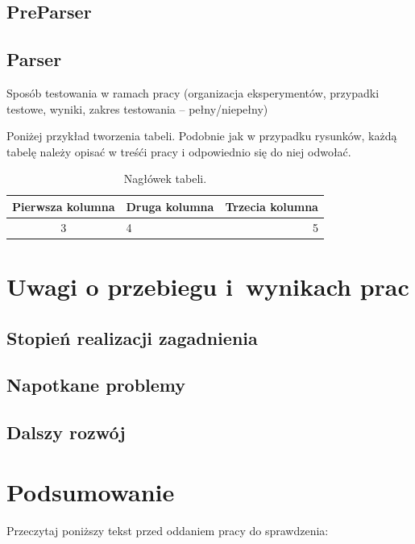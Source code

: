 \documentclass[a4paper]{book}
\begin{document}
\section {PreParser}
\section {Parser}
Sposób testowania w ramach pracy (organizacja eksperymentów, przypadki testowe, wyniki, zakres testowania -- pełny/niepełny)

Poniżej przykład tworzenia tabeli. Podobnie jak w przypadku rysunków, każdą tabelę należy opisać w treśći pracy i odpowiednio się do niej odwołać.

\begin{table}
	\centering
	\caption{Nagłówek tabeli.}
	\begin{tabular}{|c|l|r|}
		\hline
		Pierwsza kolumna & Druga kolumna & Trzecia kolumna \\
		\hline
		3 & 4 & 5 \\
		\hline 
	\end{tabular}
	\label{tab:przyklad_tabeli}
\end{table}

\chapter{Uwagi o przebiegu i~wynikach prac}
\section {Stopień realizacji zagadnienia}
\section{Napotkane problemy}
\section{Dalszy rozwój}

\chapter{Podsumowanie}


Przeczytaj poniższy tekst przed oddaniem pracy do sprawdzenia:


\end{document}
